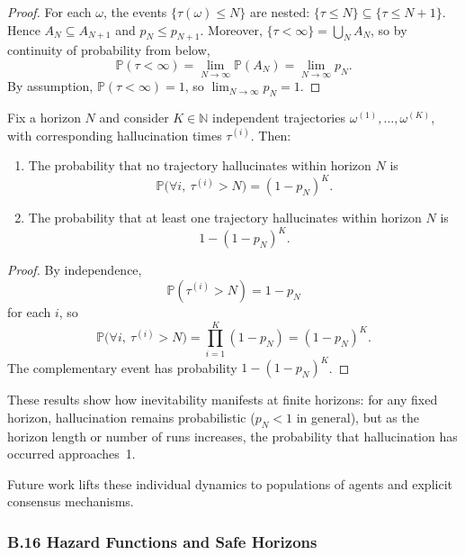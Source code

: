 \begin{proof}
For each \(\omega\), the events \(\{\tau(\omega)\le N\}\) are nested:
\(\{\tau\le N\}\subseteq\{\tau\le N+1\}\). Hence
\(A_N\subseteq A_{N+1}\) and \(p_N\le p_{N+1}\). Moreover,
\(\{\tau<\infty\}=\bigcup_{N} A_N\), so by continuity of probability
from below,
\[
\mathbb{P}(\tau<\infty)
 =
\lim_{N\to\infty} \mathbb{P}(A_N)
 =
\lim_{N\to\infty} p_N.
\]
By assumption, \(\mathbb{P}(\tau<\infty)=1\), so
\(\lim_{N\to\infty} p_N=1\).
\end{proof}

\begin{proposition}
Fix a horizon \(N\) and consider \(K\in\mathbb{N}\) independent
trajectories \(\omega^{(1)},\dots,\omega^{(K)}\), with corresponding
hallucination times \(\tau^{(i)}\). Then:
\begin{enumerate}
  \item The probability that no trajectory hallucinates within horizon
        \(N\) is
        \[
        \mathbb{P}\bigl(\forall i,\ \tau^{(i)} > N\bigr)
         = (1-p_N)^K.
        \]
  \item The probability that at least one trajectory hallucinates
        within horizon \(N\) is
        \[
        1 - (1-p_N)^K.
        \]
\end{enumerate}
\end{proposition}

\begin{proof}
By independence,
\[
\mathbb{P}(\tau^{(i)} > N) = 1 - p_N
\]
for each \(i\), so
\[
\mathbb{P}\bigl(\forall i,\ \tau^{(i)} > N\bigr)
 =
\prod_{i=1}^K (1-p_N)
 =
(1-p_N)^K.
\]
The complementary event has probability \(1-(1-p_N)^K\).
\end{proof}

These results show how inevitability manifests at finite horizons: for
any fixed horizon, hallucination remains probabilistic (\(p_N<1\) in
general), but as the horizon length or number of runs increases, the
probability that hallucination has occurred approaches~1.

\medskip

Future work lifts these individual dynamics to populations of agents and
explicit consensus mechanisms.

\subsubsection*{B.16 Hazard Functions and Safe Horizons}

